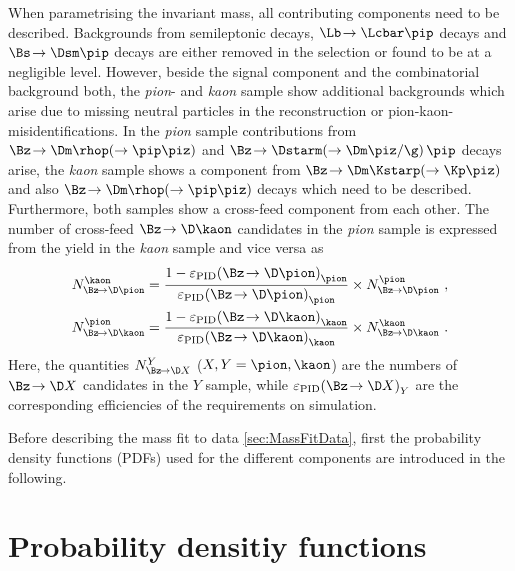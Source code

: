 When parametrising the invariant \Bz mass, all contributing components need to be described. Backgrounds from semileptonic decays, \mbox{$\Lb\!\to\Lcbar\pip$} decays and \mbox{$\Bs\!\to\Dsm\pip$} decays are either removed in the selection or found to be at a negligible level.
However, beside the signal component and the combinatorial background both, the \emph{pion}- and \emph{kaon} sample show additional backgrounds which arise due to missing neutral particles in the reconstruction or pion-kaon-misidentifications.
In the \emph{pion} sample contributions from $\Bz\!\to\Dm\rhop\!\left(\to\pip\piz\right)$ and $\Bz\!\to\Dstarm\!\left(\to\Dm\piz/\g\right)\pip$ decays arise, the \emph{kaon} sample shows a component from $\Bz\!\to\Dm\Kstarp\!\left(\to\Kp\piz\right)$ and also $\Bz\!\to\Dm\rhop\!\left(\to\pip\piz\right)$ decays which need to be described.
Furthermore, both samples show a cross-feed component from each other.
The number of cross-feed $\Bz\!\to\D\kaon$ candidates in the \emph{pion} sample is expressed from the yield in the \emph{kaon} sample and vice versa as
\begin{equation}
\begin{aligned}
N_{\Bz\!\to\D\pion}^{\kaon}&=\frac{1-\varepsilon_{\text{PID}}\!\left(\Bz\!\to\D \pion\right)_{\pion}}{\varepsilon_{\text{PID}}\!\left(\Bz\!\to\D \pion\right)_{\pion}}\times N_{\Bz\!\to\D\pion}^{\pion} \,\,,\\
N_{\Bz\!\to\D\kaon}^{\pion}&=\frac{1-\varepsilon_{\text{PID}}\!\left(\Bz\!\to\D \kaon\right)_{\kaon}}{\varepsilon_{\text{PID}}\!\left(\Bz\!\to\D \kaon\right)_{\kaon}}\times N_{\Bz\!\to\D\kaon}^{\kaon}\,\,.\label{eq:ConstrainCrossFeed}
\end{aligned}
\end{equation}
Here, the quantities $N_{\Bz\!\to\D X}^{Y}$ ($X,Y=\pion,\kaon$) are the numbers of $\Bz\!\to\D X$ candidates in the $Y$ sample, while $\varepsilon_{\text{PID}}\!\left(\Bz\!\to\D X\right)_Y$ are the corresponding efficiencies of the \dllkpi requirements on simulation.

Before describing the mass fit to data {\cref{sec:MassFitData}}, first the probability density functions (PDFs) used for the different components are introduced in the following.

\section{Probability densitiy functions}
\label{sec:PDFs}

